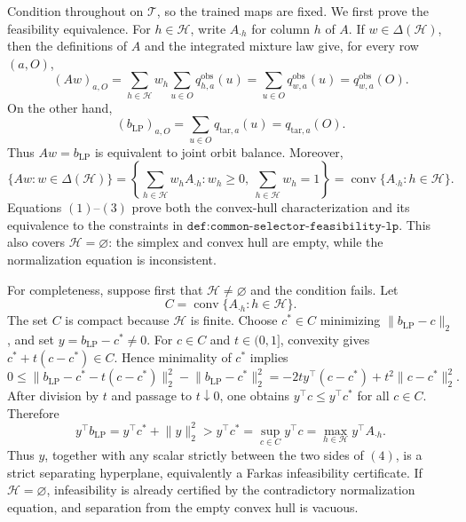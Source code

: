Condition throughout on \(\mathcal T\), so the trained maps are fixed. We first prove the feasibility equivalence. For \(h\in\mathcal H\), write \(A_{\cdot h}\) for column \(h\) of \(A\). If \(w\in\Delta(\mathcal H)\), then the definitions of \(A\) and the integrated mixture law give, for every row \((a,O)\),
\[
(Aw)_{a,O}=\sum_{h\in\mathcal H}w_h\sum_{u\in O}q^{\mathrm{obs}}_{h,a}(u)=\sum_{u\in O}q^{\mathrm{obs}}_{w,a}(u)=q^{\mathrm{obs}}_{w,a}(O).
\tag{1}
\]
On the other hand,
\[
(b_{\mathrm{LP}})_{a,O}=\sum_{u\in O}q_{\mathrm{tar},a}(u)=q_{\mathrm{tar},a}(O).
\tag{2}
\]
Thus \(Aw=b_{\mathrm{LP}}\) is equivalent to joint orbit balance. Moreover,
\[
\{Aw:w\in\Delta(\mathcal H)\}=\left\{\sum_{h\in\mathcal H}w_hA_{\cdot h}:w_h\ge0,\ \sum_{h\in\mathcal H}w_h=1\right\}=\operatorname{conv}\{A_{\cdot h}:h\in\mathcal H\}.
\tag{3}
\]
Equations \((1)\)--\((3)\) prove both the convex-hull characterization and its equivalence to the constraints in \(\texttt{def:common-selector-feasibility-lp}\). This also covers \(\mathcal H=\varnothing\): the simplex and convex hull are empty, while the normalization equation is inconsistent.

For completeness, suppose first that \(\mathcal H\neq\varnothing\) and the condition fails. Let
\[
C=\operatorname{conv}\{A_{\cdot h}:h\in\mathcal H\}.
\]
The set \(C\) is compact because \(\mathcal H\) is finite. Choose \(c^*\in C\) minimizing \(\lVert b_{\mathrm{LP}}-c\rVert_2\), and set \(y=b_{\mathrm{LP}}-c^*\neq0\). For \(c\in C\) and \(t\in(0,1]\), convexity gives \(c^*+t(c-c^*)\in C\). Hence minimality of \(c^*\) implies
\[
0\le \lVert b_{\mathrm{LP}}-c^*-t(c-c^*)\rVert_2^2-\lVert b_{\mathrm{LP}}-c^*\rVert_2^2=-2t y^\top(c-c^*)+t^2\lVert c-c^*\rVert_2^2.
\]
After division by \(t\) and passage to \(t\downarrow0\), one obtains \(y^\top c\le y^\top c^*\) for all \(c\in C\). Therefore
\[
y^\top b_{\mathrm{LP}}=y^\top c^*+\lVert y\rVert_2^2>y^\top c^*=\sup_{c\in C}y^\top c=\max_{h\in\mathcal H}y^\top A_{\cdot h}.
\tag{4}
\]
Thus \(y\), together with any scalar strictly between the two sides of \((4)\), is a strict separating hyperplane, equivalently a Farkas infeasibility certificate. If \(\mathcal H=\varnothing\), infeasibility is already certified by the contradictory normalization equation, and separation from the empty convex hull is vacuous.

